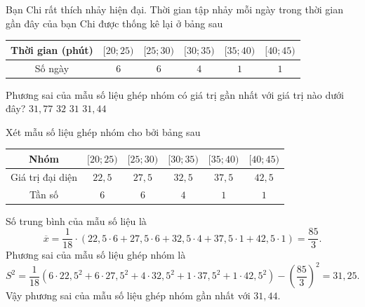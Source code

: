 \begin{ex}%
	Bạn Chi rất thích nhảy hiện đại. Thời gian tập nhảy mỗi ngày trong thời gian gần đây của bạn Chi được thống kê lại ở bảng sau
	\begin{center}
		\begin{tabular}{|c|c|c|c|c|c|}
			\hline
			Thời gian (phút)&$[20;25)$  & $[25;30)$ & $[30;35)$ & $[35;40)$ & $[40;45)$ \\
			\hline
			Số ngày	& $6$ & $6$ & $4$ & $1$ & $1$ \\
			\hline
		\end{tabular}
	\end{center}
	Phương sai của mẫu số liệu ghép nhóm có giá trị gần nhất với giá trị nào dưới đây?
	\choice 
	{$31{,}77$}
	{$32$}
	{$31$}
	{\True $31{,}44$}
	\loigiai 
	{
		Xét mẫu số liệu ghép nhóm cho bởi bảng sau
		\begin{center}
			\begin{tabular}{|c|c|c|c|c|c|}
				\hline
				Nhóm &$[20;25)$  & $[25;30)$ & $[30;35)$ & $[35;40)$ & $[40;45)$ \\
				\hline
				Giá trị đại diện & $22{,}5$ & $27{,}5$ & $32{,}5$ & $37{,}5$ & $42{,}5$ \\
				\hline
				Tần số	& $6$ & $6$ & $4$ & $1$ & $1$ \\
				\hline
			\end{tabular}
		\end{center}
		Số trung bình của mẫu số liệu là 
		$$\overline{x}=\dfrac{1}{18}\cdot (22{,}5\cdot 6+27{,}5\cdot 6+32{,}5\cdot 4+37{,}5\cdot 1+42{,}5\cdot 1)=\dfrac{85}{3}.$$
		Phương sai của mẫu số liệu ghép nhóm là 
		$$S^2=\dfrac{1}{18}\left(6\cdot 22{,}5^2+6\cdot 27{,}5^2+4\cdot 32{,}5^2+1\cdot 37{,}5^2+1\cdot 42{,}5^2\right)-\left(\dfrac{85}{3}\right)^2=31{,}25.$$
		Vậy phương sai của mẫu số liệu ghép nhóm gần nhất với $31{,}44$.
	}
\end{ex}

